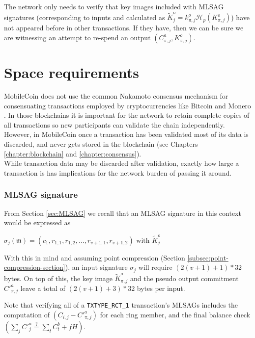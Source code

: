 The network only needs to verify that key images included with MLSAG signatures (corresponding to inputs and calculated as $\tilde{K}^o_{j} = k^o_{\pi,j} \mathcal{H}_p(K^o_{\pi,j})$) have not appeared before in other transactions. If they have, then we can be sure we are witnessing an attempt to re-spend an output $(C^a_{\pi,j}, K_{\pi,j}^o)$.



\section{Space requirements}
\label{sec:ringct-space-and-ver}

MobileCoin does not use the common Nakamoto consensus mechanism for consensuating transactions employed by cryptocurrencies like Bitcoin \cite{Nakamoto_bitcoin} and Monero \cite{cryptoNoteWhitePaper}. In those blockchains it is important for the network to retain complete copies of all transactions so new participants can validate the chain independently. However, in MobileCoin once a transaction has been validated most of its data is discarded, and never gets stored in the blockchain (see Chapters \ref{chapter:blockchain} and \ref{chapter:consensus}).\\

While transaction data may be discarded after validation, exactly how large a transaction is has implications for the network burden of passing it around.

\subsubsection*{MLSAG signature}

From Section \ref{sec:MLSAG} we recall that an MLSAG signature in this context would be expressed as

\hfill \(\sigma_j(\mathfrak{m}) = (c_1, r_{1, 1}, r_{1, 2}, ..., r_{v+1, 1}, r_{v+1, 2}) \textrm{ with } \tilde{K}^o_j \) \hfill \phantom{.}

With this in mind and assuming point compression (Section \ref{subsec:point-compression-section}), an input signature $\sigma_j$ will require \( (2(v+1) + 1) * 32  \) bytes. On top of this, the key image $\tilde{K}^o_{\pi,j}$ and the pseudo output commitment $C'^a_{\pi,j}$ leave a total of $(2(v+1)+3) * 32$ bytes per input.

Note that verifying all of a {\tt TXTYPE\_RCT\_1} transaction's MLSAGs includes the computation of \( (C_{i, j} - C'^a_{\pi, j}) \) for each ring member, and the final balance check \( (\sum_j C'^a_{j} \stackrel{?}{=} \sum_t C^b_{t} + f H)\).

